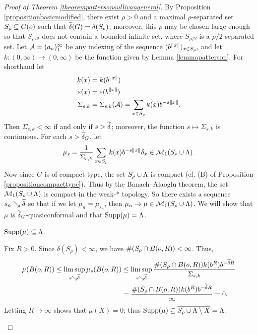 \begin{proof}[Proof of Theorem \ref{theorempattersonsullivangeneral}]
By Proposition \ref{propositionbasicmodified}, there exist $\rho > 0$ and a maximal $\rho$-separated set $S_\rho\subset G(\zero)$ such that $\w\delta(G) = \delta(S_\rho)$; moreover, this $\rho$ may be chosen large enough so that $S_{\rho/2}$ does not contain a bounded infinite set, where $S_{\rho/2}$ is a $\rho/2$-separated set. Let $\AA = (a_n)_1^\infty$ be any indexing of the sequence $(b^{\dox x})_{x\in S_\rho}$, and let $k:(0,\infty)\to(0,\infty)$ be the function given by Lemma \ref{lemmapatterson}. For shorthand let
\begin{align*}
k(x) &= k(b^{\dox x})\\
\epsilon(x) &= \epsilon(b^{\dox x})\\
\Sigma_{s,k} &= \Sigma_{s,k}(\AA) = \sum_{x\in S_\rho} k(x) b^{-s\dox x}.
\end{align*}
Then $\Sigma_{s,k} < \infty$ if and only if $s > \w\delta$; moreover, the function $s\mapsto \Sigma_{s,k}$ is continuous. For each $s > \w\delta_G$, let
\begin{equation}
\label{musdef}
\mu_s = \frac{1}{\Sigma_{s,k}}\sum_{x\in S_\rho}k(x) b^{-s\dox x}\delta_x\in\MM_1(S_\rho\cup\LambdaG).
\end{equation}
Now since $G$ is of compact type, the set $S_\rho\cup\LambdaG$ is compact (cf. (B) of Proposition \ref{propositioncompacttype}). Thus by the Banach--Alaoglu theorem, the set $\MM_1(S_\rho\cup\LambdaG)$ is compact in the weak-* topology. So there exists a sequence $s_n\searrow\w\delta$ so that if we let $\mu_n = \mu_{s_n}$, then $\mu_n\to\mu\in\MM_1(S_\rho\cup\LambdaG)$. We will show that $\mu$ is $\w\delta_G$-quasiconformal and that $\Supp(\mu) = \LambdaG$.

\begin{claim}
\label{claimboundarysupport}
$\Supp(\mu) \subset\Lambda$.
\end{claim}
\begin{subproof}
Fix $R > 0$. Since $\delta(S_\rho) < \infty$, we have $\#(S_\rho\cap B(\zero,R)) < \infty$. Thus,
\begin{align*}
\mu(B(\zero,R)) \leq \limsup_{s\searrow\w\delta} \mu_s(B(\zero,R))
&\leq \limsup_{s\searrow\w\delta} \frac{\#(S_\rho\cap B(\zero,R)) k(b^R) b^{-\w\delta R}}{\Sigma_{s,k}}\\
&= \frac{\#(S_\rho\cap B(\zero,R)) k(b^R) b^{-\w\delta R}}{\infty} = 0.
\end{align*}
Letting $R\to\infty$ shows that $\mu(X) = 0$; thus $\Supp(\mu)\subset \cl{S_\rho\cup\Lambda\butnot X} = \Lambda$.
\end{subproof}


\end{proof}
